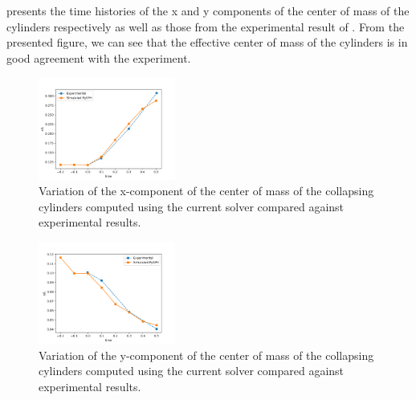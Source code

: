  presents the
time histories of the x and y components of the center of mass of the cylinders
respectively as well as those from the experimental result of
\citep{zhang_simulation_2009}. From the presented figure, we can see that the
effective center of mass of the cylinders is in good agreement with the
experiment.
\begin{figure}[!htpb]
  \centering
  \includegraphics[width=0.4\textwidth]{figures/rfc/figures/stack_of_cylinders_2d/Mohseni_Vyas/xcom}
  \caption{Variation of the x-component of the center of mass of the collapsing
    cylinders computed using the current solver compared against experimental
    results.}
\label{fig:x-com-stack-of-cylinders}
\end{figure}
\begin{figure}[!htpb]
  \centering
  \includegraphics[width=0.4\textwidth]{figures/rfc/figures/stack_of_cylinders_2d/Mohseni_Vyas/ycom}
  \caption{Variation of the y-component of the center of mass of the collapsing
    cylinders computed using the current solver compared against experimental
    results.}
\label{fig:y-com-stack-of-cylinders}
\end{figure}


\FloatBarrier%
